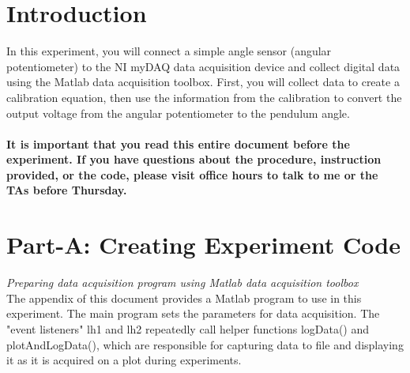 \documentclass{article} %
\begin{document}
\section{Introduction}
In this experiment, you will connect a simple angle sensor (angular potentiometer) to the NI myDAQ data acquisition device and collect digital data using the Matlab data acquisition toolbox. First, you will collect data to create a calibration equation, then use the information from the calibration to convert the output voltage from the angular potentiometer to the pendulum angle. \\ \\

\large {\textbf{It is important that you read this entire document before the experiment. If you have questions about the procedure, instruction provided, or the code, please visit office hours to talk to me or the TAs before Thursday. }}

\section{Part-A: Creating Experiment Code}
\emph{Preparing data acquisition program using Matlab data acquisition toolbox}\\
The appendix of this document provides a Matlab program to use in this experiment. The main program sets the parameters for data acquisition. The "event listeners" lh1 and lh2 repeatedly call helper functions logData() and plotAndLogData(), which are responsible for capturing data to file and displaying it as it is acquired on a plot during experiments. 
\end{document}

